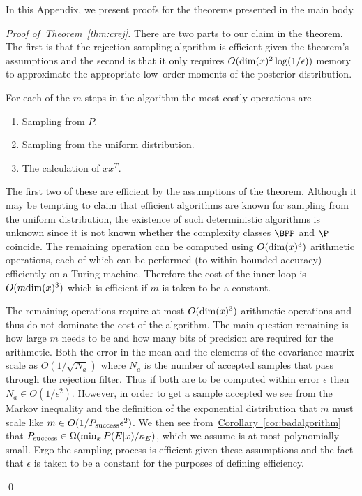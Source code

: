 \documentclass[twoside]{article}
\newenvironment{proofof}[1]{\begin{trivlist}\item[]{\flushleft\it
Proof of~#1.}}
{\qed\end{trivlist}}
\newcommand{\thm}[1]{\hyperref[thm:#1]{Theorem~\ref*{thm:#1}}}
\newcommand{\cor}[1]{\hyperref[cor:#1]{Corollary~\ref*{cor:#1}}}
\begin{document}
In this Appendix, we present proofs for the theorems presented in the main
body.

\begin{proofof}{\thm{crej}}
There are two parts to our claim in the theorem.  The first is that the rejection sampling algorithm is efficient given the theorem's assumptions
and the second is that it only requires $O({\rm dim}(x)^2 \log(1/\epsilon))$ memory to approximate the appropriate low--order moments of
 the posterior distribution.

For each of the $m$ steps in the algorithm the most costly operations are 
\begin{enumerate}
\item Sampling from $P$.
\item Sampling from the uniform distribution.
\item The calculation of $xx^T$.
\end{enumerate}
The first two of these are efficient by the assumptions of the theorem.  Although it may be tempting to claim that efficient algorithms are known
for sampling from the uniform distribution, the existence of such deterministic algorithms is unknown since it is not known whether the complexity
classes $\BPP$ and $\P$ coincide.  The remaining operation can be computed using $O({\rm dim}(x)^3)$ arithmetic operations, each of which can
be performed (to within bounded accuracy) efficiently on a Turing machine.  Therefore the cost of the inner loop is $O(m{\rm dim}(x)^3)$ which is efficient
if $m$ is taken to be a constant.

The remaining operations require at most $O({\rm dim}(x)^3)$ arithmetic operations and thus do not dominate the cost of the algorithm.  The main question remaining
is how large $m$ needs to be and how many bits of precision are required for the arithmetic.  Both the error in the mean and the elements of the covariance matrix scale as $O(1/\sqrt{N_a})$ where $N_a$ is the number of accepted samples that pass through the rejection filter.  Thus if both are to be computed within error $\epsilon$ then $N_a \in O(1/\epsilon^2)$.  However, in order to get a sample accepted we see from the Markov inequality and the definition of the exponential distribution that $m$ must scale like $m\in O(1/P_{\rm success} \epsilon^2)$.  We then see from~\cor{badalgorithm} that $P_{\rm success} \in \Omega(\min_x P(E|x)/\kappa_E)$, which we assume is at most polynomially small.  Ergo the sampling process is efficient given these assumptions and the fact that $\epsilon$ is taken to be a constant for the purposes of defining efficiency.


\end{proofof}
\end{document}
